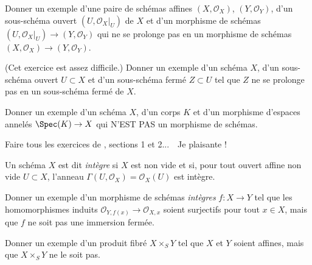 \begin{exercise}
\label{exercise-morphism-does-not-extend}
Donner un exemple d'une paire de schémas affines
$(X, {\mathcal O}_X)$, $(Y, {\mathcal O}_Y)$,
d'un sous-schéma ouvert $(U, {\mathcal O}_X|_U)$
de $X$ et d'un morphisme de schémas
$(U, {\mathcal O}_X|_U) \to (Y, {\mathcal O}_Y)$
qui ne se prolonge pas en un morphisme de schémas
$(X, {\mathcal O}_X) \to (Y, {\mathcal O}_Y)$.
\end{exercise}

\begin{exercise}
\label{exercise-closed-subscheme-does-not-extend}
(Cet exercice est assez difficile.)
Donner un exemple d'un schéma $X$, d'un sous-schéma ouvert $U \subset X$
et d'un sous-schéma fermé $Z \subset U$ tel que $Z$ ne se prolonge pas
en un sous-schéma fermé de $X$.
\end{exercise}

\begin{exercise}
\label{exercise-not-morphism-schemes}
Donner un exemple d'un schéma $X$, d'un corps $K$ et d'un
morphisme d'espaces annelés $\Spec(K) \to X$ qui
N'EST PAS un morphisme de schémas.
\end{exercise}

\begin{exercise}
\label{exercise-just-kidding}
Faire tous les exercices de \cite[chapitre II]{H},
sections 1 et 2...\ \ Je plaisante !
\end{exercise}

\begin{definition}
\label{definition-integral}
Un schéma $X$ est dit {\it intègre} si $X$ est non vide et si,
pour tout ouvert affine non vide $U \subset X$, l'anneau
$\Gamma(U, \mathcal{O}_X) = \mathcal{O}_X(U)$ est intègre.
\end{definition}

\begin{exercise}
\label{exercise-morphism-integral-schemes-surjective-stalks-not-closed}
Donner un exemple d'un morphisme de schémas {\it intègres}
$f : X \to Y$ tel que les homomorphismes induits ${\mathcal O}_{Y, f(x)}
\to {\mathcal O}_{X, x}$ soient surjectifs pour tout $x\in X$, mais que $f$
ne soit pas une immersion fermée.
\end{exercise}

\begin{exercise}
\label{exercise-fibre-product-affines-not-affine}
Donner un exemple d'un produit fibré $X \times_S Y$ tel que $X$ et $Y$
soient affines, mais que $X \times_S Y$ ne le soit pas.
\end{exercise}

